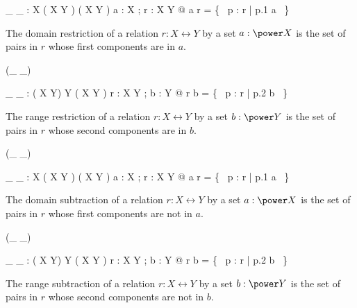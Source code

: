 \documentclass[draft,a4paper,10pt,wd]{isov2}
\begin{document}
\begin{gendef}[X,Y]
\_ \dres \_ : \power X \cross ( X \rel Y ) \fun ( X \rel Y )
\where
\forall a : \power X ; r : X \rel Y @ a \dres r = \{~ p : r | p.1 \in a ~\}
\end{gendef}

The domain restriction of a relation $r : X \rel Y$ by a set $a : \power X$ is
the set of pairs in $r$ whose first components are in $a$.


\begin{zed}
 \leftassoc (\_ \rres \_)
\end{zed}

\begin{gendef}[X,Y]
\_ \rres \_ : ( X \rel Y) \cross \power Y \fun ( X \rel Y )
\where
\forall r : X \rel Y ; b : \power Y @ r \rres b = \{~ p : r | p.2 \in b ~\}
\end{gendef}

The range restriction of a relation $r : X \rel Y$ by a set $b : \power Y$ is
the set of pairs in $r$ whose second components are in $b$.


\begin{zed}
 \rightassoc (\_ \ndres \_)
\end{zed}

\begin{gendef}[X,Y]
\_ \ndres \_ : \power X \cross ( X \rel Y ) \fun ( X \rel Y )
\where
\forall a : \power X ; r : X \rel Y @ a \ndres r = \{~ p : r | p.1 \notin a ~\}
\end{gendef}

The domain subtraction of a relation $r : X \rel Y$ by
a set $a : \power X$
is the set of pairs in $r$ whose first components are not in $a$.


\begin{zed}
 \leftassoc (\_ \nrres \_)
\end{zed}

\begin{gendef}[X,Y]
\_ \nrres \_ : ( X \rel Y) \cross \power Y \fun ( X \rel Y )
\where
\forall r : X \rel Y ; b : \power Y @
r \nrres b = \{~ p : r | p.2 \notin b ~\}
\end{gendef}

The range subtraction of a relation $r : X \rel Y$ by a set $b : \power Y$
is the set of pairs in $r$ whose second components are not in $b$.
\end{document}
